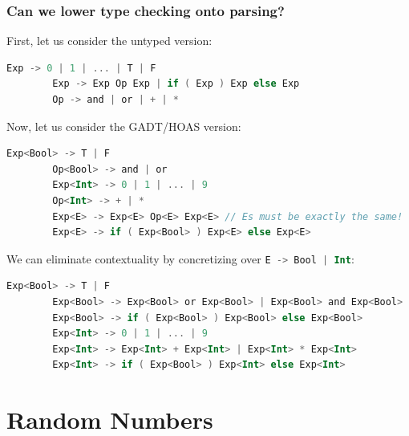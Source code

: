 \documentclass{beamer}
\begin{document}
    \begin{frame}[fragile]
        \frametitle{Can we lower type checking onto parsing?}
        First, let us consider the untyped version:
        \begin{lstlisting}[language=Kotlin, gobble=5]
        Exp -> 0 | 1 | ... | T | F
        Exp -> Exp Op Exp | if ( Exp ) Exp else Exp
        Op -> and | or | + | *
        \end{lstlisting}
        Now, let us consider the GADT/HOAS version:
        \begin{lstlisting}[language=Kotlin, gobble=5]
        Exp<Bool> -> T | F
        Op<Bool> -> and | or
        Exp<Int> -> 0 | 1 | ... | 9
        Op<Int> -> + | *
        Exp<E> -> Exp<E> Op<E> Exp<E> // Es must be exactly the same!
        Exp<E> -> if ( Exp<Bool> ) Exp<E> else Exp<E>
        \end{lstlisting}
        We can eliminate contextuality by concretizing over \lstinline[language=Kotlin]{E -> Bool | Int}:
        \begin{lstlisting}[language=Kotlin, gobble=5]
        Exp<Bool> -> T | F
        Exp<Bool> -> Exp<Bool> or Exp<Bool> | Exp<Bool> and Exp<Bool>
        Exp<Bool> -> if ( Exp<Bool> ) Exp<Bool> else Exp<Bool>
        Exp<Int> -> 0 | 1 | ... | 9
        Exp<Int> -> Exp<Int> + Exp<Int> | Exp<Int> * Exp<Int>
        Exp<Int> -> if ( Exp<Bool> ) Exp<Int> else Exp<Int>
        \end{lstlisting}
    \end{frame}

    \section{Random Numbers}
\end{document}
